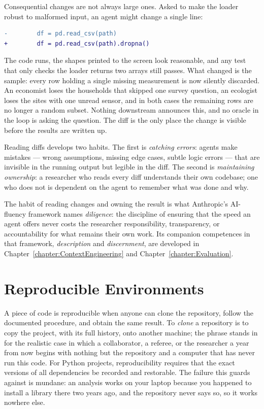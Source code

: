 \begin{example}
Consequential changes are not always large ones.
Asked to make the loader robust to malformed input, an agent might change a single line:
\begin{lstlisting}[language=diff]
-        df = pd.read_csv(path)
+        df = pd.read_csv(path).dropna()
\end{lstlisting}
The code runs, the shapes printed to the screen look reasonable, and any test that only checks the loader returns two arrays still passes.
What changed is the sample: every row holding a single missing measurement is now silently discarded.
An economist loses the households that skipped one survey question, an ecologist loses the sites with one unread sensor, and in both cases the remaining rows are no longer a random subset.
Nothing downstream announces this, and no oracle in the loop is asking the question.
The diff is the only place the change is visible before the results are written up.
\end{example}

Reading diffs develops two habits.
The first is \emph{catching errors}: agents make mistakes --- wrong assumptions, missing edge cases, subtle logic errors --- that are invisible in the running output but legible in the diff.
The second is \emph{maintaining ownership}: a researcher who reads every diff understands their own codebase; one who does not is dependent on the agent to remember what was done and why.

\begin{remark}
The  habit of reading changes and owning the result is what Anthropic's AI-fluency framework names \emph{diligence}: the discipline of ensuring that the speed an agent offers never costs the researcher responsibility, transparency, or accountability for what remains their own work.
Its companion competences in that framework, \emph{description} and \emph{discernment}, are developed in Chapter~\ref{chapter:ContextEngineering} and Chapter~\ref{chapter:Evaluation}.
\end{remark}

\section{Reproducible Environments}
\label{section:ReproducibleEnvironments}

A piece of code is reproducible when anyone can clone the repository, follow the documented procedure, and obtain the same result.
To \emph{clone} a repository is to copy the project, with its full history, onto another machine; the phrase stands in for the realistic case in which a collaborator, a referee, or the researcher a year from now begins with nothing but the repository and a computer that has never run this code.
For Python projects, reproducibility requires that the exact versions of all dependencies be recorded and restorable.
The failure this guards against is mundane: an analysis works on your laptop because you happened to install a library there two years ago, and the repository never says so, so it works nowhere else.

